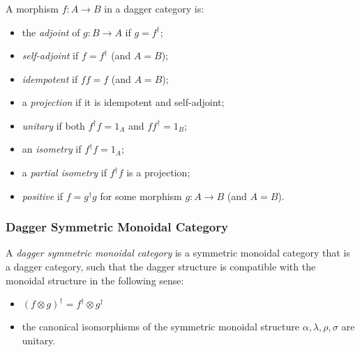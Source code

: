 \documentclass[UTF8,11pt,colorlinks,compress,openany]{beamer}%
\begin{document}
\begin{frame}\frametitle{}
\begin{definition}
A morphism $f:A\to B$ in a dagger category is:
\begin{itemize}
	\item the \emph{adjoint} of $g:B\to A$ if $g=f^\dagger$;
	\item \emph{self-adjoint} if $f=f^\dagger$ (and $A=B$);
	\item \emph{idempotent} if $ff=f$ (and $A=B$);
	\item a \emph{projection} if it is idempotent and self-adjoint;
	\item \emph{unitary} if both $f^\dagger f=1_A$ and $ff^\dagger=1_B$;
	\item an \emph{isometry} if $f^\dagger f=1_A$;
	\item a \emph{partial isometry} if $f^\dagger f$ is a projection;
	\item \emph{positive} if $f=g^\dagger g$ for some morphism $g:A\to B$ (and $A=B$).
\end{itemize}
\end{definition}
\end{frame}

\begin{frame}\frametitle{Dagger Symmetric Monoidal Category}
\begin{definition}
	A \emph{dagger symmetric monoidal category} is a symmetric monoidal category that is a dagger category, such that the dagger structure is compatible with the monoidal structure in the following sense:
	\begin{itemize}
		\item $(f\otimes g)^\dagger=f^\dagger\otimes g^\dagger$
		\item the canonical isomorphisms of the symmetric monoidal structure $\alpha,\lambda,\rho,\sigma$ are unitary.
	\end{itemize}	
\end{definition}
\end{frame}
\end{document}
